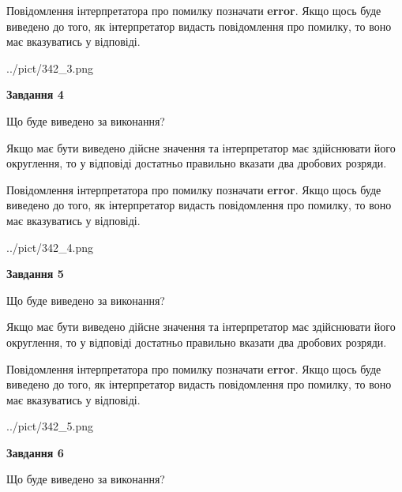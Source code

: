 \documentclass[12pt, ukrainian]{article}
\begin{document}
{\begin {Large}
Повідомлення інтерпретатора про помилку позначати \textbf{error}.
Якщо щось буде виведено до того, як інтерпретатор видасть повідомлення про помилку, 
то воно має вказуватись у відповіді. \par

\begin{center}
	{../pict/342_3.png}
\end{center}
\newpage

{\begin {center}\textbf{Завдання 4}\end {center}}\par
Що буде виведено за виконання? \par

Якщо має бути виведено дійсне значення та інтерпретатор має здійснювати його округлення, 
то у відповіді достатньо правильно вказати два дробових розряди.

Повідомлення інтерпретатора про помилку позначати \textbf{error}.
Якщо щось буде виведено до того, як інтерпретатор видасть повідомлення про помилку, 
то воно має вказуватись у відповіді. \par

\begin{center}
	{../pict/342_4.png}
\end{center}
\newpage

{\begin {center}\textbf{Завдання 5}\end {center}}\par
Що буде виведено за виконання? \par

Якщо має бути виведено дійсне значення та інтерпретатор має здійснювати його округлення, 
то у відповіді достатньо правильно вказати два дробових розряди.

Повідомлення інтерпретатора про помилку позначати \textbf{error}.
Якщо щось буде виведено до того, як інтерпретатор видасть повідомлення про помилку, 
то воно має вказуватись у відповіді. \par

\begin{center}
	{../pict/342_5.png}
\end{center}
\newpage

{\begin {center}\textbf{Завдання 6}\end {center}}\par
Що буде виведено за виконання? \par


\end{Large}}
\end{document}
